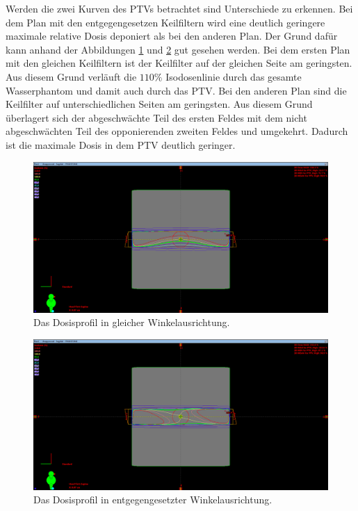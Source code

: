 Werden die zwei Kurven des PTVs betrachtet sind Unterschiede zu erkennen. Bei dem
Plan mit den entgegengesetzen Keilfiltern wird eine deutlich geringere maximale relative
Dosis deponiert als bei den anderen Plan. Der Grund dafür kann anhand der Abbildungen
\ref{fig:aufgabe244} und \ref{fig:aufgabe2441} gut gesehen werden. Bei dem ersten Plan
mit den gleichen Keilfiltern ist der Keilfilter auf der gleichen Seite am geringsten.
Aus diesem Grund verläuft die $110\%$ Isodosenlinie durch das gesamte Wasserphantom und
damit auch durch das PTV. Bei den anderen Plan sind die Keilfilter auf unterschiedlichen
Seiten am geringsten. Aus diesem Grund überlagert sich der abgeschwächte Teil des ersten
Feldes mit dem nicht abgeschwächten Teil des opponierenden zweiten Feldes und umgekehrt.
Dadurch ist die maximale Dosis in dem PTV deutlich geringer.


\begin{figure}[H]
	\centering
	\includegraphics[width=0.7\linewidth]{../../Wasserphantom Bilder/Aufgabe244}
	\caption{Das Dosisprofil in gleicher Winkelausrichtung.}
	\label{fig:aufgabe244}
\end{figure}

\begin{figure}[H]
	\centering
	\includegraphics[width=0.7\linewidth]{../../Wasserphantom Bilder/Aufgabe2441}
	\caption{Das Dosisprofil in entgegengesetzter Winkelausrichtung.}
	\label{fig:aufgabe2441}
\end{figure}


